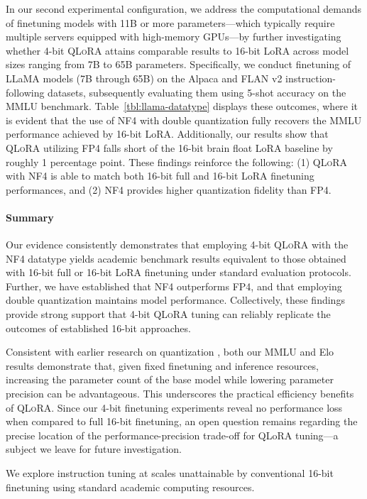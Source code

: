 In our second experimental configuration, we address the computational demands of finetuning models with 11B or more parameters—which typically require multiple servers equipped with high-memory GPUs—by further investigating whether 4-bit \textsc{QLoRA} attains comparable results to 16-bit LoRA across model sizes ranging from 7B to 65B parameters. Specifically, we conduct finetuning of LLaMA models (7B through 65B) on the Alpaca and FLAN v2 instruction-following datasets, subsequently evaluating them using 5-shot accuracy on the MMLU benchmark. Table~\ref{tbl:llama-datatype} displays these outcomes, where it is evident that the use of NF4 with double quantization fully recovers the MMLU performance achieved by 16-bit LoRA. Additionally, our results show that \textsc{QLoRA} utilizing FP4 falls short of the 16-bit brain float LoRA baseline by roughly 1 percentage point. These findings reinforce the following: (1) \textsc{QLoRA} with NF4 is able to match both 16-bit full and 16-bit LoRA finetuning performances, and (2) NF4 provides higher quantization fidelity than FP4.

\paragraph{Summary} Our evidence consistently demonstrates that employing 4-bit \textsc{QLoRA} with the NF4 datatype yields academic benchmark results equivalent to those obtained with 16-bit full or 16-bit LoRA finetuning under standard evaluation protocols. Further, we have established that NF4 outperforms FP4, and that employing double quantization maintains model performance. Collectively, these findings provide strong support that 4-bit \textsc{QLoRA} tuning can reliably replicate the outcomes of established 16-bit approaches.

Consistent with earlier research on quantization \citep{dettmers2022case}, both our MMLU and Elo results demonstrate that, given fixed finetuning and inference resources, increasing the parameter count of the base model while lowering parameter precision can be advantageous. This underscores the practical efficiency benefits of \textsc{QLoRA}. Since our 4-bit finetuning experiments reveal no performance loss when compared to full 16-bit finetuning, an open question remains regarding the precise location of the performance-precision trade-off for QLoRA tuning—a subject we leave for future investigation.

We explore instruction tuning at scales unattainable by conventional 16-bit finetuning using standard academic computing resources.

